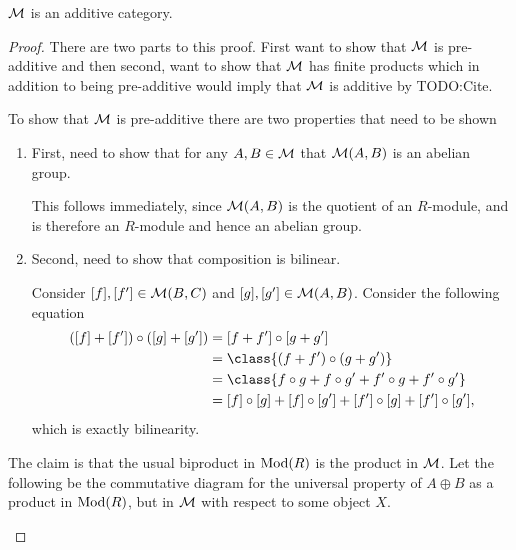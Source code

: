 \begin{lemma}
    \( {\mathcal{M}} \) is an additive category.
\end{lemma}
\begin{proof}
    There are two parts to this proof. First want to show that \( {\mathcal{M}} \) is pre-additive and then second, want to show that \( {\mathcal{M}} \) has finite products which in addition to being pre-additive would imply that \( {\mathcal{M}} \) is additive by TODO:Cite.

    To show that \( {\mathcal{M}} \) is pre-additive there are two properties that need to be shown
    \begin{enumerate}
        \item {
            First, need to show that for any \( A, B \in {\mathcal{M}} \) that \( {\mathcal{M}}(A, B) \) is an abelian group.

            This follows immediately, since \( {\mathcal{M}}(A, B) \) is the quotient of an \( R \)-module, and is therefore an \( R \)-module and hence an abelian group.
        }
        \item {
            Second, need to show that composition is bilinear.

            Consider \( [f], [f'] \in {\mathcal{M}}(B, C) \) and \( [g], [g'] \in {\mathcal{M}}(A, B) \). Consider the following equation
            \begin{align*}
                ([f] + [f']) \circ ([g] + [g']) &= [f + f'] \circ [g + g'] \\
                &= \class{(f + f') \circ (g + g')} \\
                &= \class{f \circ g + f \circ g' + f' \circ g + f' \circ g'} \\
                &= [f] \circ [g] + [f] \circ [g'] + [f'] \circ [g] + [f'] \circ [g'],
            \end{align*}
            which is exactly bilinearity.
        }
    \end{enumerate}

    The claim is that the usual biproduct in \( \operatorname{Mod}(R) \) is the product in \( {\mathcal{M}} \). Let the following be the commutative diagram for the universal property of \( A \oplus B \) as a product in \( \operatorname{Mod}(R) \), but in \( {\mathcal{M}} \) with respect to some object \( X \).
    \begin{center}
\end{center}
\end{proof}
